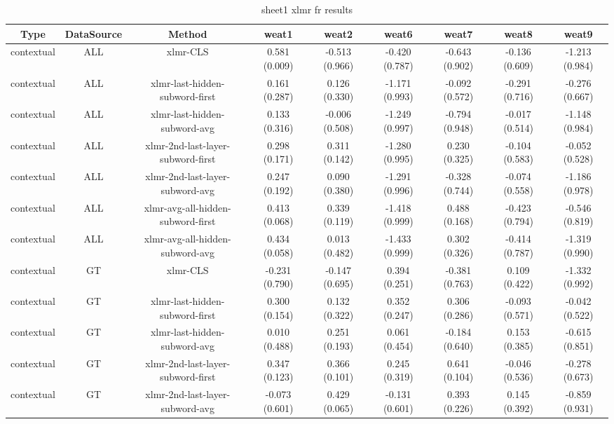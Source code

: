 \begin{sidewaystable}[htb]
    \centering
    \caption{sheet1 xlmr fr results}
    \label{appendix_tab:sheet1_xlmr_fr_results}
    \small
    \begin{tabular}{@{}ccccccccc@{}}
        \toprule
        Type & DataSource & Method & weat1 & weat2 & weat6 & weat7 & weat8 & weat9 \\
        \midrule
        contextual & ALL & xlmr-CLS & 0.581 (0.009) & -0.513 (0.966) & -0.420 (0.787) & -0.643 (0.902) & -0.136 (0.609) & -1.213 (0.984) \\
        contextual & ALL & xlmr-last-hidden-subword-first & 0.161 (0.287) & 0.126 (0.330) & -1.171 (0.993) & -0.092 (0.572) & -0.291 (0.716) & -0.276 (0.667) \\
        contextual & ALL & xlmr-last-hidden-subword-avg & 0.133 (0.316) & -0.006 (0.508) & -1.249 (0.997) & -0.794 (0.948) & -0.017 (0.514) & -1.148 (0.984) \\
        contextual & ALL & xlmr-2nd-last-layer-subword-first & 0.298 (0.171) & 0.311 (0.142) & -1.280 (0.995) & 0.230 (0.325) & -0.104 (0.583) & -0.052 (0.528) \\
        contextual & ALL & xlmr-2nd-last-layer-subword-avg & 0.247 (0.192) & 0.090 (0.380) & -1.291 (0.996) & -0.328 (0.744) & -0.074 (0.558) & -1.186 (0.978) \\
        contextual & ALL & xlmr-avg-all-hidden-subword-first & 0.413 (0.068) & 0.339 (0.119) & -1.418 (0.999) & 0.488 (0.168) & -0.423 (0.794) & -0.546 (0.819) \\
        contextual & ALL & xlmr-avg-all-hidden-subword-avg & 0.434 (0.058) & 0.013 (0.482) & -1.433 (0.999) & 0.302 (0.326) & -0.414 (0.787) & -1.319 (0.990) \\
        contextual & GT & xlmr-CLS & -0.231 (0.790) & -0.147 (0.695) & 0.394 (0.251) & -0.381 (0.763) & 0.109 (0.422) & -1.332 (0.992) \\
        contextual & GT & xlmr-last-hidden-subword-first & 0.300 (0.154) & 0.132 (0.322) & 0.352 (0.247) & 0.306 (0.286) & -0.093 (0.571) & -0.042 (0.522) \\
        contextual & GT & xlmr-last-hidden-subword-avg & 0.010 (0.488) & 0.251 (0.193) & 0.061 (0.454) & -0.184 (0.640) & 0.153 (0.385) & -0.615 (0.851) \\
        contextual & GT & xlmr-2nd-last-layer-subword-first & 0.347 (0.123) & 0.366 (0.101) & 0.245 (0.319) & 0.641 (0.104) & -0.046 (0.536) & -0.278 (0.673) \\
        contextual & GT & xlmr-2nd-last-layer-subword-avg & -0.073 (0.601) & 0.429 (0.065) & -0.131 (0.601) & 0.393 (0.226) & 0.145 (0.392) & -0.859 (0.931) \\

\end{tabular}
\end{sidewaystable}
